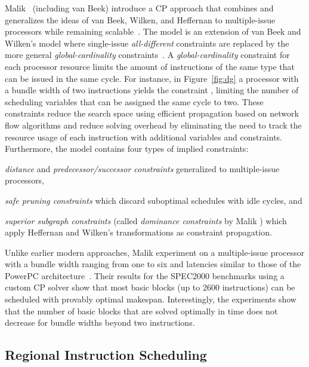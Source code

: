 \documentclass[acmsmall,authorversion,nonacm]{acmart}
\begin{document}
Malik~\etal{} (including van Beek) introduce a CP approach that
combines and generalizes the ideas of van Beek, Wilken, and Heffernan
to multiple-issue processors while remaining
scalable~\cite{Malik2008}.
The model is an extension of van Beek and Wilken's model where
single-issue \emph{all-different} constraints are replaced by the more
general \emph{global-cardinality} constraints~\cite{CPH:global}.
A \emph{global-cardinality} constraint for each processor resource
limits the amount of instructions of the same type that can be issued
in the same cycle.
For instance, in Figure~\ref{fig:dg} a processor with a bundle width
of two instructions yields the constraint
, limiting the number of
scheduling variables that can be assigned the same cycle to two.
These constraints reduce the search space using efficient propagation
based on network flow algorithms and reduce solving overhead by
eliminating the need to track the resource usage of each instruction
with additional variables and constraints.
Furthermore, the model contains four types of implied constraints:
\begin{inparaitem}[]
\item \emph{distance} and \emph{predecessor/successor constraints}
  generalized to multiple-issue processors,
\item \emph{safe pruning constraints} which discard suboptimal
  schedules with idle cycles, and
\item \emph{superior subgraph constraints} (called \emph{dominance
  constraints} by Malik \etal{}) which apply Heffernan and Wilken's
  transformations as constraint propagation.
\end{inparaitem}
Unlike earlier modern approaches, Malik \etal{} experiment on a
multiple-issue processor with a bundle width ranging from one to six
and latencies similar to those of the PowerPC
architecture~\cite{Diefendorff1994}.
Their results for the SPEC2000 benchmarks using a custom CP solver
show that most basic blocks (up to 2600 instructions) can be scheduled
with provably optimal makespan.
Interestingly, the experiments show that the number of basic blocks
that are solved optimally in time does not decrease for bundle widths
beyond two instructions.

\subsection{Regional Instruction Scheduling}
\label{sec:regional-instruction-scheduling}
\end{document}
